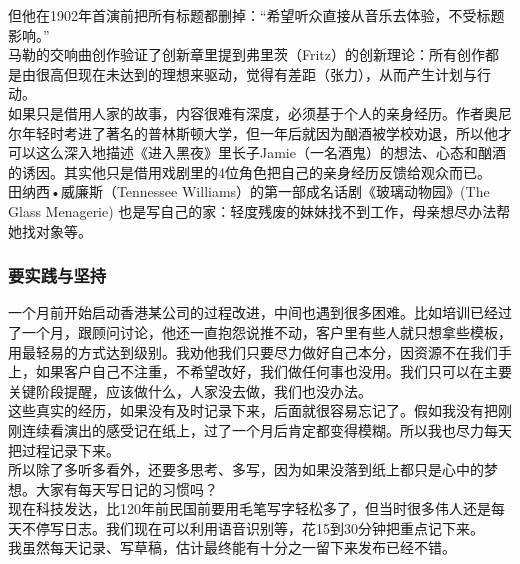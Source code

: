 \documentclass{article}        %
\begin{document}
但他在1902年首演前把所有标题都删掉：``希望听众直接从音乐去体验，不受标题影响。''\\
马勒的交响曲创作验证了创新章里提到弗里茨（Fritz）的创新理论：所有创作都是由很高但现在未达到的理想来驱动，觉得有差距（张力），从而产生计划与行动。\\
如果只是借用人家的故事，内容很难有深度，必须基于个人的亲身经历。作者奥尼尔年轻时考进了著名的普林斯顿大学，但一年后就因为酗酒被学校劝退，所以他才可以这么深入地描述《进入黑夜》里长子Jamie（一名酒鬼）的想法、心态和酗酒的诱因。其实他只是借用戏剧里的4位角色把自己的亲身经历反馈给观众而已。\\
田纳西•威廉斯（Tennessee Williams）的第一部成名话剧《玻璃动物园》(The
Glass Menagerie)
也是写自己的家：轻度残废的妹妹找不到工作，母亲想尽办法帮她找对象等。

\hypertarget{ux8981ux5b9eux8df5ux4e0eux575aux6301}{%
\subsubsection{要实践与坚持}\label{ux8981ux5b9eux8df5ux4e0eux575aux6301}}

一个月前开始启动香港某公司的过程改进，中间也遇到很多困难。比如培训已经过了一个月，跟顾问讨论，他还一直抱怨说推不动，客户里有些人就只想拿些模板，用最轻易的方式达到级别。我劝他我们只要尽力做好自己本分，因资源不在我们手上，如果客户自己不注重，不希望改好，我们做任何事也没用。我们只可以在主要关键阶段提醒，应该做什么，人家没去做，我们也没办法。\\
这些真实的经历，如果没有及时记录下来，后面就很容易忘记了。假如我没有把刚刚连续看演出的感受记在纸上，过了一个月后肯定都变得模糊。所以我也尽力每天把过程记录下来。\\
所以除了多听多看外，还要多思考、多写，因为如果没落到纸上都只是心中的梦想。大家有每天写日记的习惯吗？\\
现在科技发达，比120年前民国前要用毛笔写字轻松多了，但当时很多伟人还是每天不停写日志。我们现在可以利用语音识别等，花15到30分钟把重点记下来。\\
我虽然每天记录、写草稿，估计最终能有十分之一留下来发布已经不错。

\end{document}

